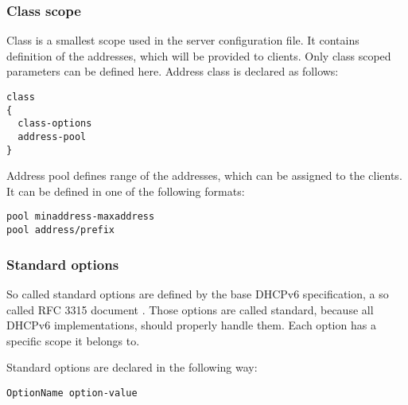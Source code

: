 \subsubsection{Class scope}
Class is a smallest scope used in the server configuration file. It
contains definition of the addresses, which will be provided to
clients. Only class scoped parameters can be defined here. Address class
is declared as follows:
\begin{verbatim}
class
{  
  class-options
  address-pool    
}
\end{verbatim}

Address pool defines range of the addresses, which can be assigned to the
clients. It can be defined in one of the following formats:
\begin{verbatim}
pool minaddress-maxaddress
pool address/prefix
\end{verbatim}

\subsubsection{Standard options}

So called standard options are defined by the base DHCPv6 specification,
a so called RFC 3315 document \cite{rfc3315}. Those options are
called standard, because all DHCPv6 implementations, should properly
handle them. Each option has a specific scope it belongs to. 

Standard options are declared in the following way:

\begin{verbatim}
OptionName option-value
\end{verbatim}

